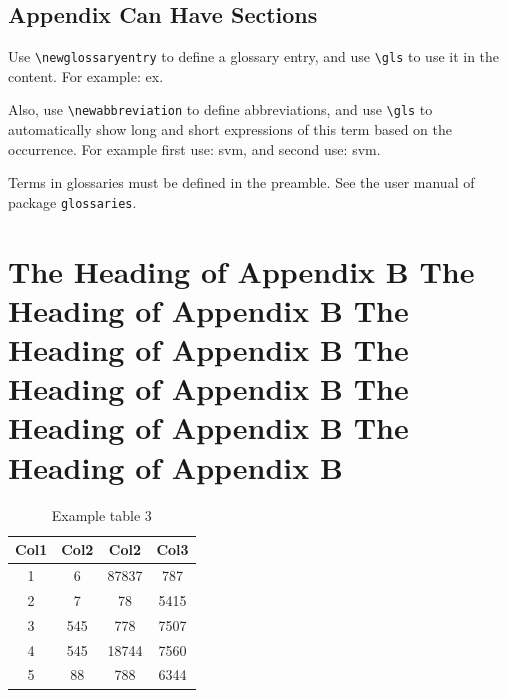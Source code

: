 \documentclass[debug, font=Times]{gw-dissertation}[2021/11/19]
\begin{document}
    \section{Appendix Can Have Sections}
    \lipsum[6]

    Use \verb!\newglossaryentry! to define a glossary entry, and use \verb!\gls! to use it in the
    content.
    For example: \gls{ex}.

    Also, use \verb!\newabbreviation! to define abbreviations, and use \verb!\gls! to automatically show
    long and short expressions of this term based on the occurrence.
    For example first use: \gls{svm}, and second use: \gls{svm}.

    Terms in glossaries must be defined in the preamble.
    See the user manual of package \verb!glossaries!.

\chapter{
    The Heading of Appendix B
    The Heading of Appendix B
    The Heading of Appendix B
    The Heading of Appendix B
    The Heading of Appendix B
    The Heading of Appendix B
}
    \lipsum[7]
    \begin{table}[h!]
        \centering
        \begin{tabular}{||c c c c||}
             \hline
             Col1 & Col2 & Col2 & Col3 \\ [0.5ex]
             \hline\hline
             1 & 6 & 87837 & 787 \\
             2 & 7 & 78 & 5415 \\
             3 & 545 & 778 & 7507 \\
             4 & 545 & 18744 & 7560 \\
             5 & 88 & 788 & 6344 \\ [1ex]
             \hline
        \end{tabular}
        \caption{Example table 3}
    \end{table}
    \lipsum[1]
\end{document}

